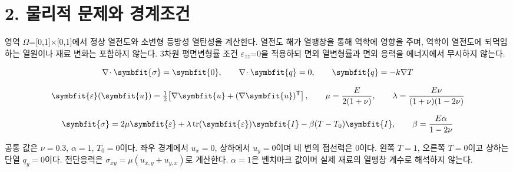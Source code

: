 \documentclass[10pt,a4paper]{article}
\renewcommand{\boldsymbol}[1]{\symbfit{#1}}
\begin{document}
\clearpage

\section{2. 물리적 문제와 경계조건}

영역 $\Omega$=[0,1]$\times$[0,1]에서 정상 열전도와 소변형 등방성 열탄성을 계산한다. 열전도 해가 열팽창을 통해 역학에 영향을 주며, 역학이 열전도에 되먹임하는 열원이나 재료 변화는 포함하지 않는다. 3차원 평면변형률 조건 $\varepsilon_{zz}$=0을 적용하되 면외 열변형률과 면외 응력을 에너지에서 무시하지 않는다.\par

\begin{equation}\nabla\!\cdot\boldsymbol{\sigma}=\boldsymbol{0},\qquad \nabla\!\cdot\boldsymbol{q}=0,\qquad \boldsymbol{q}=-k\nabla T\end{equation}

\begin{equation}\boldsymbol{\varepsilon}(\boldsymbol{u})=\tfrac12\!\left[\nabla\boldsymbol{u}+(\nabla\boldsymbol{u})^{\mathsf T}\right],\qquad \mu=\frac{E}{2(1+\nu)},\qquad \lambda=\frac{E\nu}{(1+\nu)(1-2\nu)}\end{equation}

\begin{equation}\boldsymbol{\sigma}=2\mu\boldsymbol{\varepsilon}+\lambda\operatorname{tr}(\boldsymbol{\varepsilon})\boldsymbol{I}-\beta(T-T_0)\boldsymbol{I},\qquad \beta=\frac{E\alpha}{1-2\nu}\end{equation}

공통 값은 $\nu=0.3$, $\alpha=1$, $T_0=0$이다. 좌우 경계에서 $u_x=0$, 상하에서 $u_y=0$이며 네 변의 접선력은 0이다. 왼쪽 $T=1$, 오른쪽 $T=0$이고 상하는 단열 $q_y=0$이다. 전단응력은 $\sigma_{xy}=\mu(u_{x,y}+u_{y,x})$로 계산한다. $\alpha=1$은 벤치마크 값이며 실제 재료의 열팽창 계수로 해석하지 않는다.\par

\begingroup\small
\end{document}
